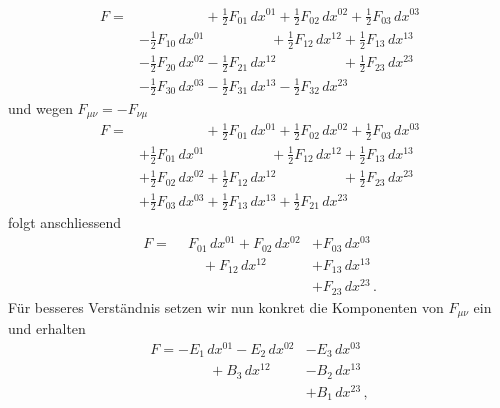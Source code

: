 \begin{align*}
	F
	=
	&\phantom{+ \frac{1}{2} F_{00} \, dx^{00}} + \frac{1}{2} F_{01} \, dx^{01} + \frac{1}{2} F_{02} \, dx^{02} + \frac{1}{2} F_{03} \, dx^{03}
	\\
	&- \frac{1}{2} F_{10} \, dx^{01} \phantom{+ \frac{1}{2} F_{11} \, dx^{11}} + \frac{1}{2} F_{12} \, dx^{12} + \frac{1}{2} F_{13} \, dx^{13}
	\\
	&- \frac{1}{2} F_{20} \, dx^{02} - \frac{1}{2} F_{21} \, dx^{12} \phantom{+ \frac{1}{2} F_{22} \, dx^{22}} + \frac{1}{2} F_{23} \, dx^{23}
	\\
	&- \frac{1}{2} F_{30} \, dx^{03} - \frac{1}{2} F_{31} \, dx^{13} - \frac{1}{2} F_{32} \, dx^{23} \phantom{+ \frac{1}{2} F_{33} \, dx^{33}}
\end{align*}
und wegen $F_{\mu\nu} = -F_{\nu\mu}$
\begin{align*}
	F
	=
	&\phantom{+ \frac{1}{2} F_{00} \, dx^{00}} + \frac{1}{2} F_{01} \, dx^{01} + \frac{1}{2} F_{02} \, dx^{02} + \frac{1}{2} F_{03} \, dx^{03}
	\\
	&+ \frac{1}{2} F_{01} \, dx^{01} \phantom{+ \frac{1}{2} F_{11} \, dx^{11}} + \frac{1}{2} F_{12} \, dx^{12} + \frac{1}{2} F_{13} \, dx^{13}
	\\
	&+ \frac{1}{2} F_{02} \, dx^{02} + \frac{1}{2} F_{12} \, dx^{12} \phantom{+ \frac{1}{2} F_{22} \, dx^{22}} + \frac{1}{2} F_{23} \, dx^{23}
	\\
	&+ \frac{1}{2} F_{03} \, dx^{03} + \frac{1}{2} F_{13} \, dx^{13} + \frac{1}{2} F_{21} \, dx^{23} \phantom{+ \frac{1}{2} F_{33} \, dx^{33}}
\end{align*}
folgt anschliessend
\begin{align*}
	F
	=
	\phantom{+} F_{01} \, dx^{01} + F_{02} \, dx^{02} &+ F_{03} \, dx^{03}
	\\
	\phantom{+ F_{11} \, dx^{11}} + F_{12} \, dx^{12} &+ F_{13} \, dx^{13}
	\\
	\phantom{+ F_{12} \, dx^{12}} \phantom{+ F_{22} \, dx^{22}} &+ F_{23} \, dx^{23} \, .
\end{align*}
Für besseres Verständnis setzen wir nun konkret die Komponenten von $F_{\mu\nu}$ ein und erhalten
\begin{align*}
	F
	=
	- E_1 \, dx^{01} - E_2 \, dx^{02} &- E_3 \, dx^{03}
	\\
	\phantom{+ F_{11} \, dx^{11}} + B_3 \, dx^{12} &- B_2 \, dx^{13}
	\\
	\phantom{+ F_{12} \, dx^{12}} \phantom{+ F_{22} \, dx^{22}} &+ B_1 \, dx^{23} \, ,
\end{align*}
